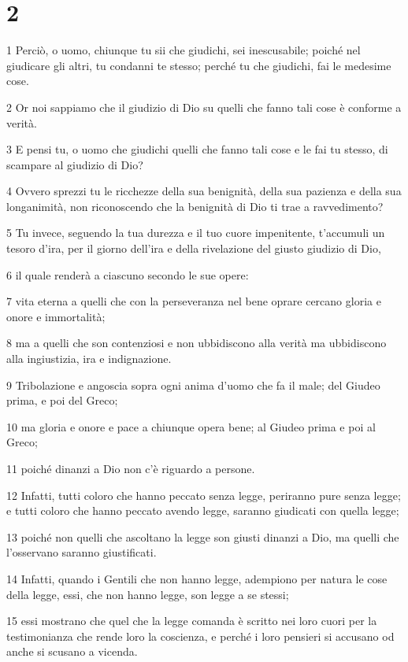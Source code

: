 \chapter{2}

\par 1 Perciò, o uomo, chiunque tu sii che giudichi, sei inescusabile; poiché nel giudicare gli altri, tu condanni te stesso; perché tu che giudichi, fai le medesime cose.
\par 2 Or noi sappiamo che il giudizio di Dio su quelli che fanno tali cose è conforme a verità.
\par 3 E pensi tu, o uomo che giudichi quelli che fanno tali cose e le fai tu stesso, di scampare al giudizio di Dio?
\par 4 Ovvero sprezzi tu le ricchezze della sua benignità, della sua pazienza e della sua longanimità, non riconoscendo che la benignità di Dio ti trae a ravvedimento?
\par 5 Tu invece, seguendo la tua durezza e il tuo cuore impenitente, t'accumuli un tesoro d'ira, per il giorno dell'ira e della rivelazione del giusto giudizio di Dio,
\par 6 il quale renderà a ciascuno secondo le sue opere:
\par 7 vita eterna a quelli che con la perseveranza nel bene oprare cercano gloria e onore e immortalità;
\par 8 ma a quelli che son contenziosi e non ubbidiscono alla verità ma ubbidiscono alla ingiustizia, ira e indignazione.
\par 9 Tribolazione e angoscia sopra ogni anima d'uomo che fa il male; del Giudeo prima, e poi del Greco;
\par 10 ma gloria e onore e pace a chiunque opera bene; al Giudeo prima e poi al Greco;
\par 11 poiché dinanzi a Dio non c'è riguardo a persone.
\par 12 Infatti, tutti coloro che hanno peccato senza legge, periranno pure senza legge; e tutti coloro che hanno peccato avendo legge, saranno giudicati con quella legge;
\par 13 poiché non quelli che ascoltano la legge son giusti dinanzi a Dio, ma quelli che l'osservano saranno giustificati.
\par 14 Infatti, quando i Gentili che non hanno legge, adempiono per natura le cose della legge, essi, che non hanno legge, son legge a se stessi;
\par 15 essi mostrano che quel che la legge comanda è scritto nei loro cuori per la testimonianza che rende loro la coscienza, e perché i loro pensieri si accusano od anche si scusano a vicenda.

